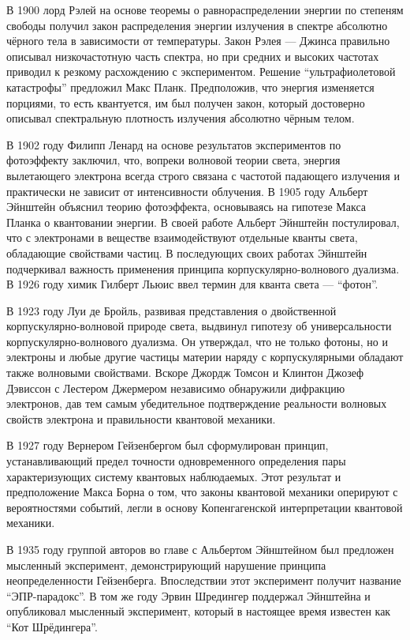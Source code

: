 В 1900 лорд Рэлей на основе теоремы о равнораспределении энергии по степеням свободы
получил закон распределения энергии излучения в спектре абсолютно чёрного тела в зависимости от температуры.
Закон Рэлея — Джинса правильно описывал низкочастотную часть спектра,
но при средних и высоких частотах приводил к резкому расхождению с экспериментом.
Решение ``ультрафиолетовой катастрофы'' предложил Макс Планк.
Предположив, что энергия изменяется порциями, то есть квантуется,
им был получен закон, который достоверно описывал спектральную плотность излучения абсолютно чёрным телом.

В 1902 году Филипп Ленард на основе результатов экспериментов по фотоэффекту заключил,
что, вопреки волновой теории света,
энергия вылетающего электрона всегда строго связана с частотой падающего излучения и практически не зависит от интенсивности облучения.
В 1905 году Альберт Эйнштейн объяснил теорию фотоэффекта, основываясь на гипотезе Макса Планка о квантовании энергии.
В своей работе Альберт Эйнштейн постулировал,
что с электронами в веществе взаимодействуют отдельные кванты света,
обладающие свойствами частиц.
В последующих своих работах Эйнштейн подчеркивал важность применения принципа корпускулярно-волнового дуализма.
В 1926 году химик Гилберт Льюис ввел термин для кванта света --- ``фотон''.

В 1923 году Луи де Бройль, развивая представления о двойственной корпуску\-лярно-волновой природе света,
выдвинул гипотезу об универсальности корпуску\-лярно-волнового дуализма.
Он утверждал, что не только фотоны, но и электроны и любые другие частицы материи наряду с корпускулярными обладают также волновыми свойствами.
Вскоре Джордж Томсон и Клинтон Джозеф Дэвиссон с Лестером Джермером независимо обнаружили дифракцию электронов, дав тем самым убедительное подтверждение реальности волновых свойств электрона и правильности квантовой механики.

В 1927 году Вернером Гейзенбергом был сформулирован принцип, устанавливающий предел точности одновременного определения пары характеризующих систему квантовых наблюдаемых. Этот результат и предположение Макса Борна о том,
что законы квантовой механики оперируют с вероятностями событий,
легли в основу Копенгагенской интерпретации квантовой механики.

В 1935 году группой авторов во главе с Альбертом Эйнштейном был предложен мысленный эксперимент,
демонстрирующий нарушение принципа неопределенности Гейзенберга.
Впоследствии этот эксперимент получит название ``ЭПР-парадокс''.
В том же году Эрвин Шредингер поддержал Эйнштейна
и опубликовал мысленный эксперимент,
который в настоящее время известен как ``Кот Шрёдингера''.

